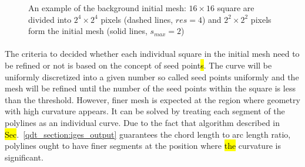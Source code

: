 \begin{figure}[h!]
    \centering
    \caption[Initial background mesh]{An example of the background initial mesh: $16 \times 16$ square are divided into $2^4 \times 2^4$ pixels (dashed lines, $res=4$) and $2^2 \times 2^2$ pixels form the initial mesh (solid lines, $s_{max}=2$)}
    \label{qdt_fig:qdt_initial_mesh}
\end{figure}

\paragraph{}
The criteria to decided whether each individual square in the initial mesh need to be refined or not is based on the concept of seed point\hl{s}.
The curve will be uniformly discretized into a given number so called seed points uniformly and the mesh will be refined until the number of the seed points within the square is less than the threshold.
However, finer mesh is expected at the region where geometry with high curvature appears.
It can be solved by treating each segment of the polylines as an individual curve.
Due to the fact that algorithm described in \hl{Sec}.~\ref{qdt_section:iges_output} guarantees the chord length to arc length ratio, polylines ought to have finer segments at the position where \hl{the} curvature is significant.

